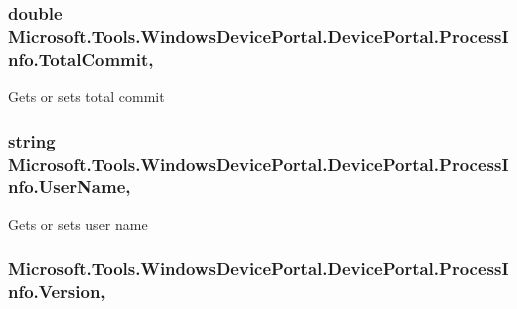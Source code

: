 \subsubsection[{\texorpdfstring{Total\+Commit}{TotalCommit}}]{\setlength{\rightskip}{0pt plus 5cm}double Microsoft.\+Tools.\+Windows\+Device\+Portal.\+Device\+Portal.\+Process\+Info.\+Total\+Commit\hspace{0.3cm}{\ttfamily [get]}, {\ttfamily [set]}}\hypertarget{class_microsoft_1_1_tools_1_1_windows_device_portal_1_1_device_portal_1_1_process_info_aac8b7e2cdc12aee90b8d2b28b6026e15}{}\label{class_microsoft_1_1_tools_1_1_windows_device_portal_1_1_device_portal_1_1_process_info_aac8b7e2cdc12aee90b8d2b28b6026e15}


Gets or sets total commit 

\subsubsection[{\texorpdfstring{User\+Name}{UserName}}]{\setlength{\rightskip}{0pt plus 5cm}string Microsoft.\+Tools.\+Windows\+Device\+Portal.\+Device\+Portal.\+Process\+Info.\+User\+Name\hspace{0.3cm}{\ttfamily [get]}, {\ttfamily [set]}}\hypertarget{class_microsoft_1_1_tools_1_1_windows_device_portal_1_1_device_portal_1_1_process_info_a18214a4d508e50b138d95a25767ecf9a}{}\label{class_microsoft_1_1_tools_1_1_windows_device_portal_1_1_device_portal_1_1_process_info_a18214a4d508e50b138d95a25767ecf9a}


Gets or sets user name 

\subsubsection[{\texorpdfstring{Version}{Version}}]{ Microsoft.\+Tools.\+Windows\+Device\+Portal.\+Device\+Portal.\+Process\+Info.\+Version\hspace{0.3cm}{\ttfamily [get]}, {\ttfamily [set]}}\hypertarget{class_microsoft_1_1_tools_1_1_windows_device_portal_1_1_device_portal_1_1_process_info_a6d6daa1d649e34152505c131e37115da}{}\label{class_microsoft_1_1_tools_1_1_windows_device_portal_1_1_device_portal_1_1_process_info_a6d6daa1d649e34152505c131e37115da}


